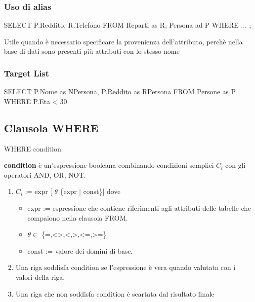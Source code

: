 \subsubsection{Uso di alias}

\begin{codiceSQL}
SELECT P.Reddito, R.Telefono
FROM Reparti as R, Persona ad P
WHERE ... ;
\end{codiceSQL}

Utile quando è necessario specificare la provenienza dell’attributo, 
perchè nella base di dati sono presenti più attributi con lo stesso nome

\subsubsection{Target List}
\begin{codiceSQL}
SELECT P.Nome as NPersona, P.Reddito as RPersona
FROM Persone as P
WHERE P.Eta < 30
\end{codiceSQL}




\subsection{Clausola WHERE}
\begin{codiceSQL}
  WHERE condition
\end{codiceSQL}

\textbf{\textcolor{black!50!red}{condition}} è un’espressione booleana combinando condizioni semplici $C_{i}$ con gli 
operatori AND, OR, NOT.
\begin{enumerate}
  \item  $C_{i}$ := expr [ $\theta$ \{expr | const\}]
dove
\begin{itemize}
  \item expr := espressione che contiene riferimenti agli attributi delle tabelle che compaiono 
nella clausola FROM.
\item $\theta \in$ \{=,<>,<,>,<=,>=\}
\item const := valore dei domini di base.
\end{itemize}
\item Una riga soddisfa \textcolor{black!50!red}{condition} se l’espressione è vera quando valutata con i valori 
della riga.
\item Una riga che non soddisfa condition è scartata dal risultato finale
\end{enumerate}





